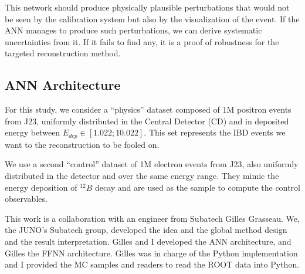 \documentclass[../main.tex]{subfiles}
\begin{document}
This network should produce physically plausible perturbations that would not be seen by the calibration system but also by the visualization of the event. If the ANN manages to produce such perturbations, we can derive systematic uncertainties from it. If it fails to find any, it is a proof of robustness for the targeted reconstruction method.

\subsection{ANN Architecture}
\label{sec:janne:arch}

For this study, we consider a ``physics'' dataset composed of 1M positron events from J23, uniformly distributed in the Central Detector (CD) and in deposited energy between $E_{dep} \in [1.022; 10.022]$. This set represents the IBD events we want to the reconstruction to be fooled on.

We use a second ``control'' dataset of 1M electron events from J23, also uniformly distributed in the detector and over the same energy range. They mimic the energy deposition of $^{12}B$ decay and are used as the sample to compute the control observables.

This work is a collaboration with an engineer from Subatech Gilles Grasseau. We, the JUNO's Subatech group, developed the idea and the global method design and the result interpretation. Gilles and I developed the ANN architecture, and Gilles the FFNN architecture. Gilles was in charge of the Python implementation and I provided the MC samples and readers to read the ROOT data into Python.
\end{document}
